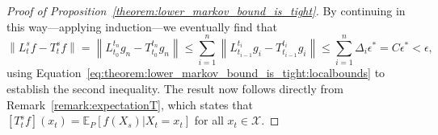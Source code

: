 \documentclass[10pt,a4paper]{paper}
\theoremstyle{definition}
\newcommand{\states}{\mathcal{X}}
\newcommand{\rateset}{\mathcal{Q}}
\newcommand{\lrate}{\underline{Q}}
\newcommand{\norm}[1]{\left\lVert #1 \right\rVert}
\begin{document}
\begin{proof}[Proof of Proposition~\ref{theorem:lower_markov_bound_is_tight}]
By continuing in this way---applying induction---we eventually find that
\begin{equation*}
\norm{L_t^sf - T_t^sf}=\norm{L_{t_0}^{t_n}g_n - T_{t_0}^{t_n}g_n} 
\leq \sum_{i=1}^{n} \norm{L_{t_{i-1}}^{t_i}g_i - T_{t_{i-1}}^{t_i}g_i}\leq\sum_{i=1}^n\Delta_i\epsilon^*=C\epsilon^*<\epsilon,
\end{equation*}
using Equation~\eqref{eq:theorem:lower_markov_bound_is_tight:localbounds} to establish the second inequality. The result now follows directly from Remark~\ref{remark:expectationT}, which states that $[T_t^sf](x_t)=\mathbb{E}_P[f(X_s)\vert X_t=x_t]$ for all $x_t\in\states$.

\end{proof}
\end{document}
